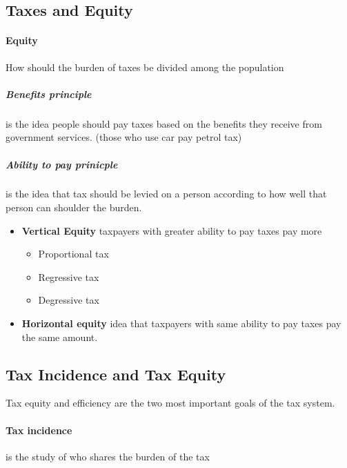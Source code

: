 \documentclass[a4paper,titlepage] {scrartcl}
\begin{document}
\subsection{Taxes and Equity} %
\label{sub:taxes_and_equity}

\paragraph{Equity} %
\label{par:equity}
How should the burden of taxes be divided among the population

\subparagraph{Benefits principle} %
\label{subp:benefits_principle}
is the idea people should pay taxes based on the benefits they receive from government services.
(those who use car pay petrol tax)

\subparagraph{Ability to pay prinicple} %
\label{subp:ability_to_pay_prinicple}
is the idea that tax should be levied on a person according to how well that person can shoulder the burden.

\begin{itemize}
	\item \textbf{Vertical Equity}	taxpayers with greater ability to pay taxes pay more
	\begin{itemize}
		\item Proportional tax
		\item Regressive tax
		\item Degressive tax
	\end{itemize}
	\item \textbf{Horizontal equity} idea that taxpayers with same ability to pay taxes pay the same amount.
\end{itemize}

\subsection{Tax Incidence and Tax Equity} %
\label{sub:tax_incidence_and_tax_equity}

Tax equity and efficiency are the two most important goals of the tax system.

\paragraph{Tax incidence} %
\label{par:tax_incidence}
is the study of who shares the burden of the tax
\end{document}
